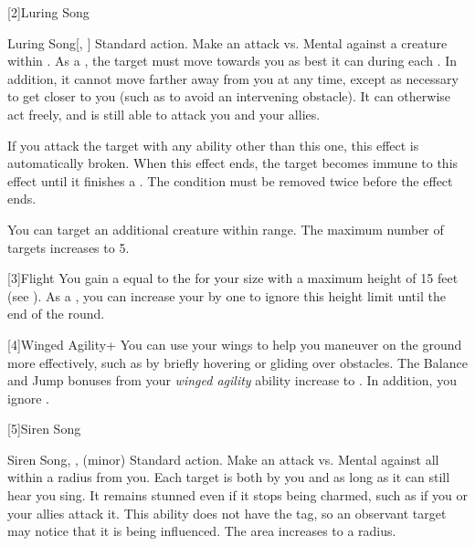       [2]{Luring Song}
      \begin{magicalactiveability}{Luring Song}[, ]
        \abilityusagetime Standard action.
        \rankline
        Make an attack vs. Mental against a creature within \longrange.
        \hit As a , the target must move towards you as best it can during each .
        In addition, it cannot move farther away from you at any time, except as necessary to get closer to you (such as to avoid an intervening obstacle).
        It can otherwise act freely, and is still able to attack you and your allies.

        If you attack the target with any ability other than this one, this effect is automatically broken.
        When this effect ends, the target becomes immune to this effect until it finishes a .
        \crit The condition must be removed twice before the effect ends.

        \rankline
         You can target an additional creature within range.
         The maximum number of targets increases to 5.
      \end{magicalactiveability}

    [3]{Flight} You gain a  equal to the  for your size with a maximum height of 15 feet (see ).
      As a , you can increase your  by one to ignore this height limit until the end of the round.

    [4]{Winged Agility+} You can use your wings to help you maneuver on the ground more effectively, such as by briefly hovering or gliding over obstacles.
      The Balance and Jump bonuses from your \textit{winged agility} ability increase to .
      In addition, you ignore .

      [5]{Siren Song}
      \begin{magicalsustainability}{Siren Song}{, ,  (minor)}
        \abilityusagetime Standard action.
        \rankline
        Make an attack vs. Mental against all  within a \medarea radius from you.
        \hit Each target is both \charmed by you and \stunned as long as it can still hear you sing.
        It remains stunned even if it stops being charmed, such as if you or your allies attack it.
        This ability does not have the  tag, so an observant target may notice that it is being influenced.
        \rankline
         The area increases to a \largearea radius.
      \end{magicalsustainability}

